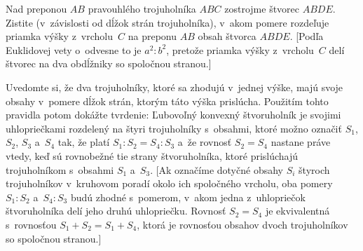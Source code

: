 {Nad preponou $AB$ pravouhlého trojuholníka $ABC$ zostrojme štvorec
$ABDE$. Zistite (v~závislosti od dĺžok strán trojuholníka), v~akom pomere
rozdeľuje priamka výšky z~vrcholu~$C$ na preponu $AB$ obsah štvorca $ABDE$.
[Podľa Euklidovej vety o~odvesne to je $a^2: b^2$, pretože priamka výšky z~vrcholu~$C$
delí štvorec na dva obdĺžniky so spoločnou stranou.]

Uvedomte si, že dva trojuholníky, ktoré sa zhodujú v~jednej výške, majú svoje
obsahy v~pomere dĺžok strán, ktorým táto výška prislúcha. Použitím tohto
pravidla potom dokážte tvrdenie: Ľubovoľný konvexný štvoruholník je svojimi
uhlopriečkami rozdelený na štyri trojuholníky s~obsahmi, ktoré možno označiť
$S_1$, $S_2$, $S_3$ a~$S_4$ tak, že platí $S_1:S_2=S_4:S_3$ a~že
rovnosť $S_2=S_4$ nastane práve vtedy, keď sú rovnobežné tie strany
štvoruholníka, ktoré prislúchajú trojuholníkom s~obsahmi $S_1$ a~$S_3$. [Ak označíme
dotyčné obsahy $S_i$ štyroch trojuholníkov v~kruhovom poradí okolo ich
spoločného vrcholu, oba pomery
$S_1:S_2$ a~$S_4:S_3$ budú zhodné s~pomerom, v~akom jedna z~uhlopriečok
štvoruholníka delí jeho druhú uhlopriečku. Rovnosť $S_2=S_4$ je
ekvivalentná s~rovnosťou $S_1+S_2=S_1+S_4$, ktorá je rovnosťou obsahov dvoch
trojuholníkov so spoločnou stranou.]
}

